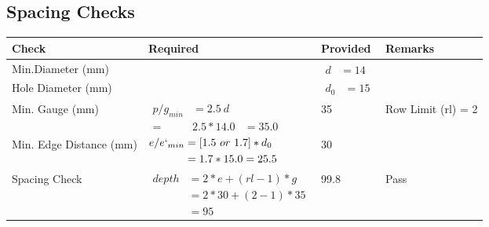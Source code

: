 \documentclass{article}%
\begin{document}
\subsection{Spacing Checks}%
\label{subsec:SpacingChecks}%
\renewcommand{\arraystretch}{1.2}%
\begin{longtable}{|p{2.5cm}|p{7.5cm}|p{3cm}|p{3cm}|}%
\hline%
\rowcolor{OsdagGreen}%
Check&Required&Provided&Remarks\\%
\hline%
\endhead%
\hline%
Min.Diameter (mm)&&$\begin{aligned} d &=14\end{aligned}$&\\%
\hline%
Hole Diameter (mm)& &$\begin{aligned} d_0 &=15\end{aligned}$&\\%
\hline%
Min. Gauge (mm)&$\begin{aligned}p/g_{min}&= 2.5 ~ d&\\ =&2.5*14.0&=35.0\end{aligned}$&35&Row Limit (rl) = 2\\%
\hline%
Min. Edge Distance (mm)&$\begin{aligned}e/e`_{min} &=[1.5~or~ 1.7] * d_0\\ &=1.7*15.0=25.5 \end{aligned}$&30&\\%
\hline%
Spacing Check&$\begin{aligned} depth & = 2 * e + (rl -1) * g \\ & = 2 * 30+(2-1)*35 \\ & = 95\end{aligned}$&99.8&Pass\\%
\hline%
\end{longtable}

%
\newpage%
\end{document}
